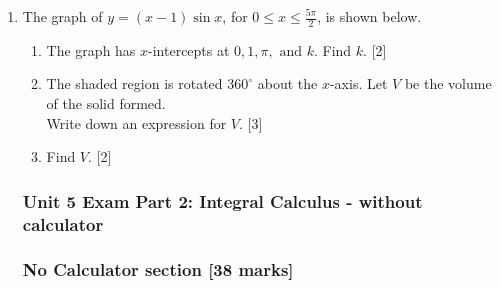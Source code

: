 \documentclass[12pt, twoside]{article}
\begin{document}
\begin{enumerate}
\newpage

\item The graph of $y=(x-1)\sin x$, for $0 \leq x \leq \frac{5 \pi}{2}$, is shown below.
      \begin{center}
      \end{center}
      \begin{enumerate}
        \item The graph has $x$-intercepts at $0,1, \pi, \text{ and }k$.
          Find $k$. \hfill [2]
        \item The shaded region is rotated $360^\circ$ about the $x$-axis. Let $V$ be the volume of the solid formed.\\
        Write down an expression for $V$. \hfill [3]
        \item Find $V$.  \hfill [2]
  \end{enumerate}

\newpage
\subsubsection*{Unit 5 Exam Part 2: Integral Calculus - without calculator}
\subsubsection*{No Calculator section \hfill [38 marks]}


\end{enumerate}
\end{document}
